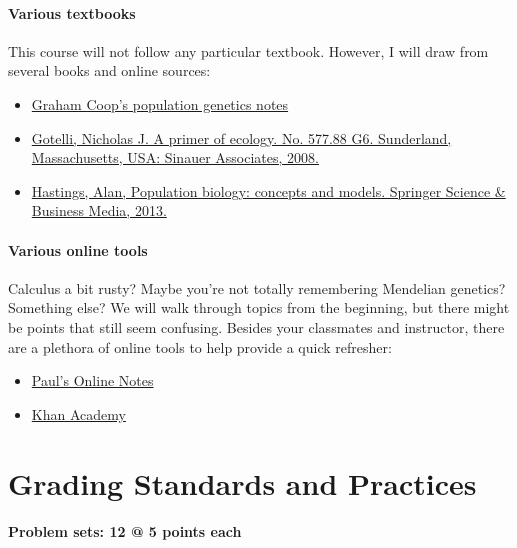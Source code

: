 \documentclass[12pt,]{article}
\providecommand{\tightlist}{%
  \setlength{\itemsep}{0pt}\setlength{\parskip}{0pt}}
\let\oldparagraph\paragraph
\renewcommand{\paragraph}[1]{\oldparagraph{#1}\mbox{}}
\begin{document}
\paragraph{Various textbooks}\label{various-textbooks}

This course will not follow any particular textbook. However, I will
draw from several books and online sources:

\begin{itemize}
\tightlist
\item
  \href{https://github.com/cooplab/popgen-notes}{Graham Coop's
  population genetics notes}
\item
  \href{https://www.amazon.com/Primer-Ecology-Fourth-Nicholas-Gotelli/dp/0878933182/ref=pd_bbs_sr_1?ie=UTF8\&s=books\&qid=1231604546\&sr=8-1}{Gotelli,
  Nicholas J. A primer of ecology. No. 577.88 G6. Sunderland,
  Massachusetts, USA: Sinauer Associates, 2008.}
\item
  \href{https://www.amazon.com/Population-Biology-Concepts-Alan-Hastings/dp/0387948538}{Hastings,
  Alan, Population biology: concepts and models. Springer Science \&
  Business Media, 2013.}
\end{itemize}

\paragraph{Various online tools}\label{various-online-tools}

Calculus a bit rusty? Maybe you're not totally remembering Mendelian
genetics? Something else? We will walk through topics from the
beginning, but there might be points that still seem confusing. Besides
your classmates and instructor, there are a plethora of online tools to
help provide a quick refresher:

\begin{itemize}
\tightlist
\item
  \href{http://tutorial.math.lamar.edu/}{Paul's Online Notes}
\item
  \href{https://www.khanacademy.org/}{Khan Academy}
\end{itemize}

\section{Grading Standards and
Practices}\label{grading-standards-and-practices}

\paragraph{Problem sets: 12 @ 5 points
each}\label{problem-sets-12-5-points-each}
\end{document}
